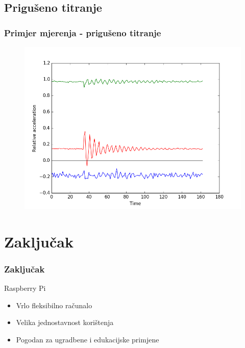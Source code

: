 \documentclass[12pt]{beamer}
\begin{document}
\subsection{Prigušeno titranje}
\begin{frame}
	\frametitle{Primjer mjerenja - prigušeno titranje}
	\begin{figure}[h]
		\centering
		\includegraphics[width=0.8\linewidth]{slike/bass3.png}
	\end{figure}
\end{frame}


\section{Zaključak}
\begin{frame}
	\frametitle{Zaključak}
	Raspberry Pi
	\begin{itemize}
		\item Vrlo fleksibilno računalo
		\item Velika jednostavnost korištenja
		\item Pogodan za ugradbene i edukacijske primjene
	\end{itemize}
\end{frame}
\end{document}
